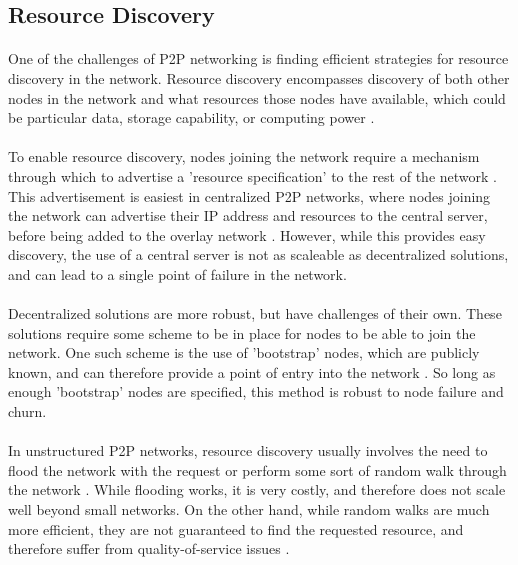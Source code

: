 \documentclass[12pt,letterpaper]{article}
\begin{document}
\subsection{Resource Discovery}
\paragraph{}
One of the challenges of P2P networking is finding efficient strategies for resource discovery in the network.
Resource discovery encompasses discovery of both other nodes in the network and what resources those nodes have available, which could be particular data, storage capability, or computing power \cite{wiki-p2p}.

\paragraph{}
To enable resource discovery, nodes joining the network require a mechanism through which to advertise a 'resource specification' to the rest of the network \cite{resource}.
This advertisement is easiest in centralized P2P networks, where nodes joining the network can advertise their IP address and resources to the central server, before being added to the overlay network \cite{resource-mobile}\cite{resource}.
However, while this provides easy discovery, the use of a central server is not as scaleable as decentralized solutions, and can lead to a single point of failure in the network.

\paragraph{}
Decentralized solutions are more robust, but have challenges of their own.
These solutions require some scheme to be in place for nodes to be able to join the network.
One such scheme is the use of 'bootstrap' nodes, which are publicly known, and can therefore provide a point of entry into the network \cite{dht-ietf}.
So long as enough 'bootstrap' nodes are specified, this method is robust to node failure and churn.

\paragraph{}
In unstructured P2P networks, resource discovery usually involves the need to flood the network with the request or perform some sort of random walk through the network \cite{resource}\cite{resource-mobile}.
While flooding works, it is very costly, and therefore does not scale well beyond small networks.
On the other hand, while random walks are much more efficient, they are not guaranteed to find the requested resource, and therefore suffer from quality-of-service issues \cite{resource}.
\end{document}
